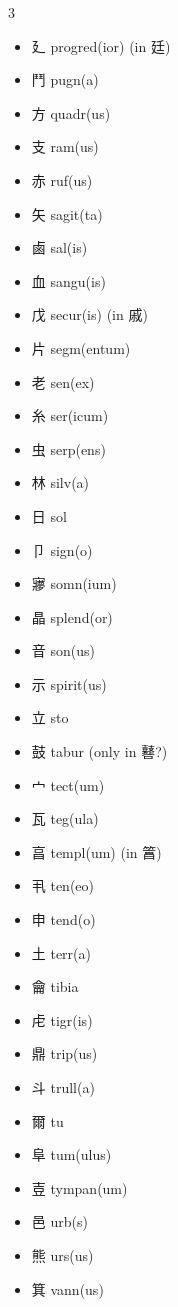 \documentclass[xetex, svgnames, 12pt]{scrartcl}
\begin{document}
\begin{multicols}{3}
\begin{itemize}[noitemsep]
    \item 廴 progred(ior) (in 廷)
    \item 鬥 pugn(a)
    \item 方 quadr(us)
    \item 支 ram(us) 
    \item 赤 ruf(us) 
    \item 矢 sagit(ta)
   \item 鹵 sal(is)
   \item 血 sangu(is)
    \item 戊 secur(is) (in 戚)
    \item 片 segm(entum)
    \item 老 sen(ex)
    \item 糸 ser(icum)
    \item 虫 serp(ens)
    \item 林 %
    silv(a) %
    \item 日 sol 
    \item 卩 sign(o) 
    \item 㝱 
    somn(ium)
    \item 晶 splend(or)
    \item 音 son(us)
    \item 示 spirit(us) 
    \item 立 sto
    \item 鼓 tabur (only in 鼛?)
    \item 宀 tect(um) 
    \item 瓦 teg(ula) 
    \item 亯 templ(um) (in 䈞)
    \item 丮 ten(eo)
    \item 申 tend(o)
    \item 土 terr(a) 
    \item 龠 tibia 
    \item 虍 
    tigr(is) 
    \item 鼎 trip(us)
    \item 斗 
    trull(a) 
    \item 爾 
    tu 
    \item 阜 tum(ulus) 
    \item 壴 
    tympan(um) 
    \item 邑 urb(s) 
    \item 熊 urs(us)
    \item 箕 vann(us)

\end{itemize}
\end{multicols}
\end{document}
